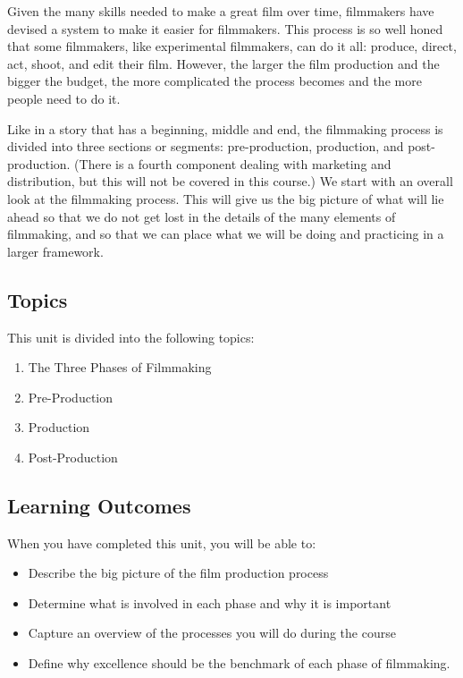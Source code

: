 \documentclass[
  letterpaper,
  DIV=11,
  numbers=noendperiod]{scrreprt}
\providecommand{\tightlist}{%
  \setlength{\itemsep}{0pt}\setlength{\parskip}{0pt}}\usepackage{longtable,booktabs,array}
\begin{document}
Given the many skills needed to make a great film over time, filmmakers
have devised a system to make it easier for filmmakers. This process is
so well honed that some filmmakers, like experimental filmmakers, can do
it all: produce, direct, act, shoot, and edit their film. However, the
larger the film production and the bigger the budget, the more
complicated the process becomes and the more people need to do it.

Like in a story that has a beginning, middle and end, the filmmaking
process is divided into three sections or segments: pre-production,
production, and post-production. (There is a fourth component dealing
with marketing and distribution, but this will not be covered in this
course.) We start with an overall look at the filmmaking process. This
will give us the big picture of what will lie ahead so that we do not
get lost in the details of the many elements of filmmaking, and so that
we can place what we will be doing and practicing in a larger framework.

\subsection*{Topics}\label{topics-1}

This unit is divided into the following topics:

\begin{enumerate}
\def\labelenumi{\arabic{enumi}.}
\tightlist
\item
  The Three Phases of Filmmaking
\item
  Pre-Production
\item
  Production
\item
  Post-Production
\end{enumerate}

\subsection*{Learning Outcomes}\label{learning-outcomes-1}

When you have completed this unit, you will be able to:

\begin{itemize}
\tightlist
\item
  Describe the big picture of the film production process
\item
  Determine what is involved in each phase and why it is important
\item
  Capture an overview of the processes you will do during the course
\item
  Define why excellence should be the benchmark of each phase of
  filmmaking.
\end{itemize}
\end{document}
